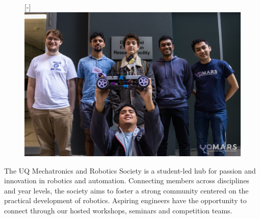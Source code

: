 \documentclass[a4paper,12pt]{report}
\begin{document}
\begin{figure}
\raisebox{0pt}[\dimexpr\height-\baselineskip\relax]{
    \includegraphics[width=0.9\linewidth]{Photos/DRC.jpg}
}
\end{figure}

The UQ Mechatronics and Robotics Society is a student-led hub for passion and innovation in robotics and automation.
Connecting members across disciplines and year levels, the society aims to foster a strong community centered on the practical development of robotics.
Aspiring engineers have the opportunity to connect through our hosted workshops, seminars and competition teams.
\end{document}
